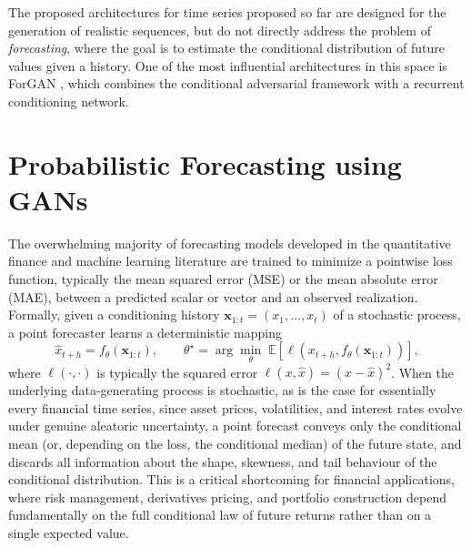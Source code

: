 The proposed architectures for time series proposed so far are designed for the generation of realistic sequences, but do not directly address the problem of \emph{forecasting}, 
where the goal is to estimate the conditional distribution of future values given a history. One of the most influential architectures in this space is ForGAN \cite{background:forgan}, 
which combines the conditional adversarial framework with a recurrent conditioning network.

\section{Probabilistic Forecasting using GANs}
The overwhelming majority of forecasting models developed in the quantitative finance and machine learning literature are trained to minimize a pointwise loss function, typically the mean squared error (MSE) or the mean absolute error (MAE), between a predicted scalar or vector and an observed realization. Formally, given a conditioning history $\mathbf{x}_{1:t} = (x_1, \dots, x_t)$ of a stochastic process, a point forecaster learns a deterministic mapping
\begin{equation*}
\hat{x}_{t+h} = f_\theta(\mathbf{x}_{1:t}), \qquad \theta^\star = \arg\min_\theta \; \mathbb{E}\left[ \ell\left(x_{t+h}, f_\theta(\mathbf{x}_{1:t})\right) \right],
\end{equation*}
where $\ell(\cdot,\cdot)$ is typically the squared error $\ell(x,\hat x) = (x-\hat x)^2$.
When the underlying data-generating process is stochastic, as is the case for essentially every financial time series, since asset prices, volatilities, and interest rates evolve under genuine aleatoric uncertainty, a point forecast conveys only the conditional mean (or, depending on the loss, the conditional median) of the future state, and discards all information about the shape, skewness, and tail behaviour of the conditional distribution.
This is a critical shortcoming for financial applications, where risk management, derivatives pricing, and portfolio construction depend fundamentally on the full conditional law of future returns rather than on a single expected value.\\

